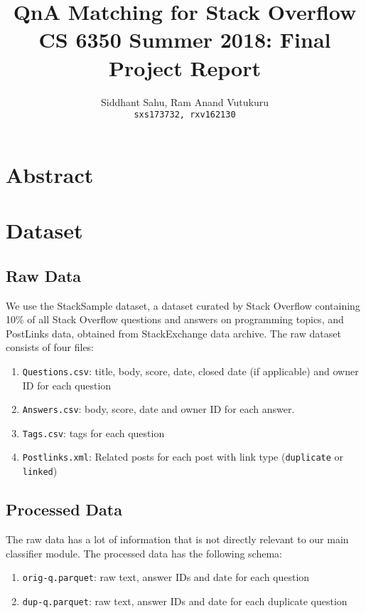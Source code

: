 \documentclass{article}
\title{QnA Matching for Stack Overflow\\
	\large CS 6350 Summer 2018: Final Project Report}
\author{Siddhant Sahu, Ram Anand Vutukuru\\
	\texttt{sxs173732, rxv162130}}
\begin{document}
\maketitle

\section{Abstract}

\section{Dataset}
\subsection{Raw Data}
We use the StackSample dataset, a dataset curated by Stack Overflow containing 10\% of all Stack Overflow questions and answers on programming topics, and PostLinks data, obtained from StackExchange data archive. The raw dataset consists of four files:
\begin{enumerate}
	\item \texttt{Questions.csv}: title, body, score, date, closed date (if applicable) and owner ID for each question
	\item \texttt{Answers.csv}: body, score, date and owner ID for each answer.
	\item \texttt{Tags.csv}: tags for each question
	\item \texttt{Postlinks.xml}: Related posts for each post with link type (\texttt{duplicate} or \texttt{linked})
\end{enumerate}

\subsection{Processed Data}
The raw data has a lot of information that is not directly relevant to our main classifier module. The processed data has the following schema:
\begin{enumerate}
	\item \texttt{orig-q.parquet}: raw text, answer IDs and date for each question
	\item \texttt{dup-q.parquet}: raw text, answer IDs and date for each duplicate question
\end{enumerate}
\end{document}
